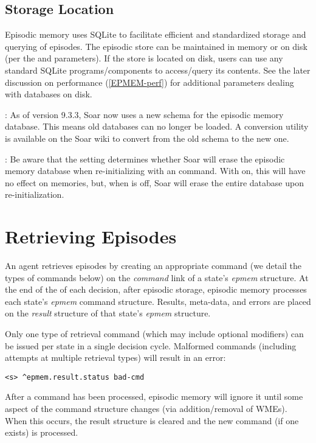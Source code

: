 \subsection{Storage Location}
Episodic memory uses SQLite to facilitate efficient and standardized storage and querying of episodes.  
The episodic store can be maintained in memory or on disk (per the  and  parameters).  
If the store is located on disk, users can use any standard SQLite programs/components to access/query its contents. 
See the later discussion on performance (\ref{EPMEM-perf}) for additional parameters dealing with databases on disk.

: As of version 9.3.3, Soar now uses a new schema for the episodic memory database. This means old databases can no longer be loaded.  A conversion utility is available on the Soar wiki to convert from the old schema to the new one.

: Be aware that the  setting determines whether Soar will erase the episodic memory database when re-initializing with an  command.  With  on, this will have no effect on memories, but, when  is off, Soar will erase the entire database upon re-initialization.

\section{Retrieving Episodes}
\label{EPMEM-retrieval}

An agent retrieves episodes by creating an appropriate command (we detail the types of commands below) on the \emph{command} link of a state's \emph{epmem} structure. 
At the end of the  of each decision, after episodic storage, episodic memory processes each state's \emph{epmem} command structure.  
Results, meta-data, and errors are placed on the \emph{result} structure of that state's \emph{epmem} structure.

Only one type of retrieval command (which may include optional modifiers) can be issued per state in a single decision cycle.  
Malformed commands (including attempts at multiple retrieval types) will result in an error:

\begin{verbatim}
<s> ^epmem.result.status bad-cmd
\end{verbatim}

After a command has been processed, episodic memory will ignore it until some aspect of the command structure changes (via addition/removal of WMEs).  
When this occurs, the result structure is cleared and the new command (if one exists) is processed.

